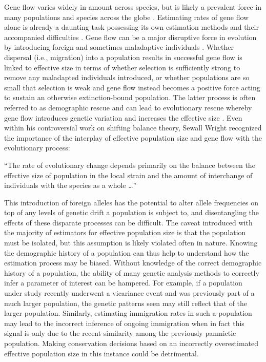 Gene flow varies widely in amount across species, but is likely a prevalent force in many populations and species across the globe \citep{Slatkin:1985, Slatkin:1987}. 
Estimating rates of gene flow alone is already a daunting task possessing its own estimation methods and their accompanied difficulties \citep{Beerli:2001, Hey:2004, Kuhner:2006, Whitlock:1999}. Gene flow can be a major disruptive force in evolution by introducing foreign and sometimes maladaptive individuals \citep{Slatkin:1987}. Whether dispersal (i.e., migration) into a population results in successful gene flow is linked to effective size in terms of whether selection is sufficiently strong to remove any maladapted individuals introduced, or whether populations are so small that selection is weak and gene flow instead becomes a positive force acting to sustain an otherwise extinction-bound population. The latter process is often referred to as demographic rescue and can lead to evolutionary rescue whereby gene flow introduces genetic variation and increases the effective size \citep{Carlson:2014, Bell:2013}. Even within his controversial work on shifting balance theory, Sewall Wright recognized the importance of the interplay of effective population size and gene flow with the evolutionary process: %
\begin{quoteshrink}
  ``The rate of evolutionary change depends primarily on the balance between the effective size of population in the local strain and the amount of interchange of individuals with the species as a whole \dots''
  \hfill\citet{Wright:1930}
\end{quoteshrink}
This introduction of foreign alleles has the potential to alter allele frequencies on top of any levels of genetic drift a population is subject to, and disentangling the effects of these disparate processes can be difficult. The caveat introduced with the majority of estimators for effective population size is that the population must be isolated, but this assumption is likely violated often in nature. Knowing the demographic history of a population can thus help to understand how the estimation process may be biased. Without knowledge of the correct demographic history of a population, the ability of many genetic analysis methods to correctly infer a parameter of interest can be hampered. For example, if a population under study recently underwent a vicariance event and was previously part of a much larger population, the genetic patterns seen may still reflect that of the larger population. Similarly, estimating immigration rates in such a population may lead to the incorrect inference of ongoing immigration when in fact this signal is only due to the recent similarity among the previously panmictic population. Making conservation decisions based on an incorrectly overestimated effective population size in this instance could be detrimental.

